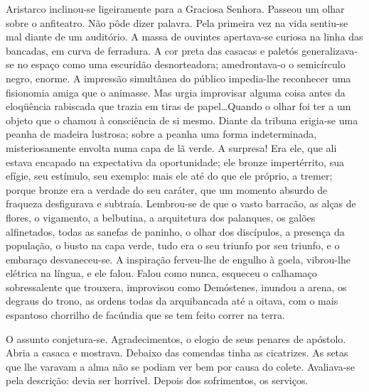 Aristarco inclinou{}-se ligeiramente para a Graciosa Senhora.
Passeou um olhar sobre o anfiteatro. Não pôde dizer palavra. Pela
primeira vez na vida sentiu{}-se mal diante de um auditório. A massa de
ouvintes apertava{}-se curiosa na linha das bancadas, em curva de
ferradura. A cor preta das casacas e paletós generalizava{}-se no
espaço como uma escuridão desnorteadora; amedrontava{}-o o semicírculo
negro, enorme. A impressão simultânea do público impedia{}-lhe
reconhecer uma fisionomia amiga que o animasse. Mas urgia improvisar
alguma coisa antes da eloqüência rabiscada que trazia em tiras de
papel\ldots Quando o olhar foi ter a um objeto que o chamou à consciência
de si mesmo. Diante da tribuna erigia{}-se uma peanha de madeira
lustrosa; sobre a peanha uma forma indeterminada, misteriosamente
envolta numa capa de lã verde. A surpresa! Era ele, que ali estava
encapado na expectativa da oportunidade; ele bronze impertérrito, sua
efígie, seu estímulo, seu exemplo: mais ele até do que ele próprio, a
tremer; porque bronze era a verdade do seu caráter, que um momento
absurdo de fraqueza desfigurava e subtraía. Lembrou{}-se de que o vasto
barracão, as alças de flores, o vigamento, a belbutina, a arquitetura
dos palanques, os galões alfinetados, todas as sanefas de paninho, o
olhar dos discípulos, a presença da população, o busto na capa verde,
tudo era o seu triunfo por seu triunfo, e o embaraço desvaneceu{}-se. A
inspiração ferveu{}-lhe de engulho à goela, vibrou{}-lhe elétrica na
língua, e ele falou. Falou como nunca, esqueceu o calhamaço
sobressalente que trouxera, improvisou como Demóstenes, inundou a
arena, os degraus do trono, as ordens todas da arquibancada até a
oitava, com o mais espantoso chorrilho de facúndia que se tem feito
correr na terra. 

O assunto conjetura{}-se. Agradecimentos, o elogio de
seus penares de apóstolo. Abria a casaca e mostrava. Debaixo das
comendas tinha as cicatrizes. As setas que lhe varavam a alma não se
podiam ver bem por causa do colete. Avaliava{}-se pela descrição: devia
ser horrível. Depois dos sofrimentos, os serviços. 


